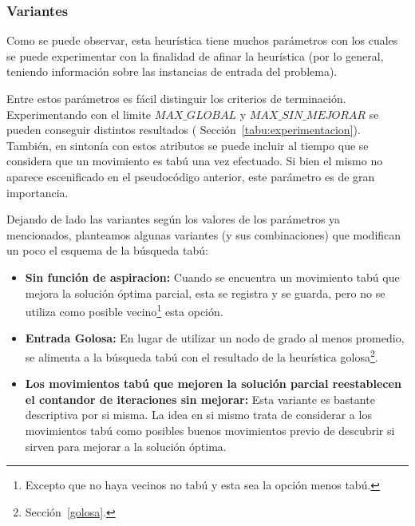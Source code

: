 \bigskip

\subsubsection{Variantes\label{tabu:variantes}}
\par Como se puede observar, esta heur\'istica tiene muchos par\'ametros
    con los cuales se puede experimentar con la finalidad de afinar
    la heur\'istica (por lo general, teniendo informaci\'on sobre las
    instancias de entrada del problema).

\par Entre estos par\'ametros es f\'acil distinguir los criterios
    de terminaci\'on. Experimentando con el limite $MAX\_GLOBAL$ y
    $MAX\_SIN\_MEJORAR$ se pueden conseguir distintos resultados (%
    Secci\'on~\ref{tabu:experimentacion}). Tambi\'en, en sinton\'ia
    con estos atributos se puede incluir al tiempo que se considera
    que un movimiento es tab\'u una vez efectuado. Si bien el mismo
    no aparece escenificado en el pseudoc\'odigo anterior, este
    par\'ametro es de gran importancia.

\par Dejando de lado las variantes seg\'un los valores de los
    par\'ametros ya mencionados, planteamos algunas variantes (y
    sus combinaciones) que modifican un poco el esquema de la
    b\'usqueda tab\'u:

\begin{itemize}
    \item \textbf{Sin funci\'on de aspiracion: } Cuando se encuentra
        un movimiento tab\'u que mejora la soluci\'on \'optima
        parcial, esta se registra y se guarda, pero no se utiliza
        como posible vecino\footnote{Excepto que no haya vecinos no tab\'u
        y esta sea la opci\'on menos tab\'u.} esta opci\'on.

    \item \textbf{Entrada Golosa: } En lugar de utilizar un nodo de grado
        al menos promedio, se alimenta a la b\'usqueda tab\'u con el resultado
        de la heur\'istica golosa\footnote{Secci\'on~\ref{golosa}.}.

    \item \textbf{Los movimientos tab\'u que mejoren la soluci\'on parcial
        reestablecen el contandor de iteraciones sin mejorar: } Esta variante
        es bastante descriptiva por si misma. La idea en si mismo trata
        de considerar a los movimientos tab\'u como posibles buenos movimientos
        previo de descubrir si sirven para mejorar a la soluci\'on \'optima.
\end{itemize}
